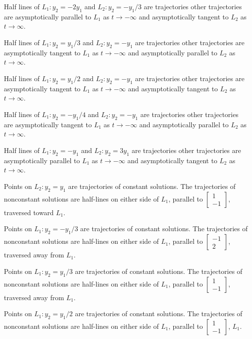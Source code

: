 Half lines of $L_1:y_2=-2y_1$ and $L_2:y_2=-y_1/3$ are trajectories other
trajectories are asymptotically parallel to $L_1$ as $t\to-\infty$ and
asymptotically tangent to $L_2$ as $t\to\infty$.

Half lines of $L_1:y_2=y_1/3$ and $L_2:y_2=-y_1$ are trajectories
other trajectories are
asymptotically tangent to $L_1$ as $t\to-\infty$ and
asymptotically parallel to $L_2$ as $t\to\infty$.

Half lines of $L_1:y_2=y_1/2$ and $L_2:y_2=-y_1$ are trajectories
other trajectories are
asymptotically tangent to $L_1$ as $t\to-\infty$ and
asymptotically tangent to $L_2$ as $t\to\infty$.

Half lines of $L_1:y_2=-y_1/4$ and $L_2:y_2=-y_1$ are trajectories
other trajectories are
asymptotically tangent to $L_1$ as $t\to-\infty$ and
asymptotically parallel to $L_2$ as $t\to\infty$.

Half lines of $L_1:y_2=-y_1$ and $L_2:y_2=3y_1$ are trajectories
other trajectories are
asymptotically parallel to $L_1$ as $t\to-\infty$ and
asymptotically tangent to $L_2$ as $t\to\infty$.

Points on $L_2:y_2=y_1$ are trajectories of constant solutions.
The trajectories of nonconstant solutions are half-lines on either
side of $L_1$, parallel to
$\begin{bmatrix}1\\{-1}\end{bmatrix}$,
traversed toward $L_1$.

Points on $L_1:y_2=-y_1/3$ are trajectories of constant solutions.
The trajectories of nonconstant solutions are half-lines on either
side of $L_1$, parallel to
$\begin{bmatrix}-1\\2\end{bmatrix}$,
traversed away from $L_1$.

Points on $L_1:y_2=y_1/3$ are trajectories of constant solutions.
The trajectories of nonconstant solutions are half-lines on either
side of $L_1$, parallel to
$\begin{bmatrix}1\\{-1}\end{bmatrix}$, traversed away from $L_1$.

Points on $L_1:y_2=y_1/2$ are trajectories of constant solutions.
The trajectories of nonconstant solutions are half-lines on either
side of $L_1$, parallel to
$\begin{bmatrix}1\\-1\end{bmatrix}$,
$L_1$.

